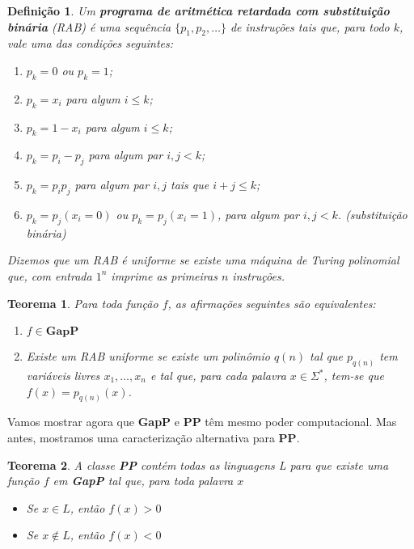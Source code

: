 \documentclass[paper=a4, fontsize=11pt]{scrartcl} %
\newtheorem{theorem}{Teorema}
\newtheorem{definition}{Definição}
\numberwithin{equation}{subsection}
\numberwithin{figure}{subsection}
\numberwithin{table}{subsection}
\numberwithin{definition}{subsection}
\numberwithin{theorem}{subsection}
\numberwithin{property}{subsection}
\numberwithin{proposition}{subsection}
\newcommand{\mwords}{\Sigma^*\xspace}
\newcommand{\PP}{\textbf{PP}\xspace}
\newcommand{\gP}{\textbf{GapP}\xspace}
\begin{document}
\begin{definition} Um \textbf{programa de aritmética retardada com substituição binária} (RAB) é uma sequência $\{p_1, p_2, \dots\}$ de instruções tais que, para todo $k$, vale uma das condições seguintes:
\begin{enumerate}
  \item $p_k = 0$ ou $p_k = 1$;
  \item $p_k = x_i$ para algum $ i \leq k$;
  \item $p_k = 1 - x_i$ para algum $ i \leq k$;
  \item $p_k = p_i - p_j$ para algum par $i, j < k$;
  \item $p_k = p_i p_j$ para algum par $i,j$ tais que $i + j \leq k$;
  \item $p_k = p_j(x_i = 0)$ ou $p_k = p_j(x_i = 1)$, para algum par $i, j < k$. (substituição binária)
\end{enumerate}
Dizemos que um RAB é uniforme se existe uma máquina de Turing polinomial que, com entrada $1^n$ imprime as primeiras $n$ instruções.

\end{definition}

\begin{theorem}
Para toda função $f$, as afirmações seguintes são equivalentes:
\begin{enumerate}

  \item $f \in \gP$
  \item Existe um RAB uniforme se existe um polinômio $q(n)$ tal que $p_{q(n)}$  tem variáveis livres $x_1, \dots, x_n$ e tal que, para cada palavra $x \in \mwords$, tem-se que $f(x) = p_{q(n)}(x)$.
\end{enumerate}

\end{theorem}


Vamos mostrar agora que \gP e \PP têm mesmo poder computacional. Mas antes, mostramos uma caracterização alternativa para \PP.

\begin{theorem}
A classe \PP contém todas as linguagens L para que existe uma função $f$ em \gP tal que, para toda palavra $x$
\begin{itemize}
  \item Se $x \in L$, então $f(x) > 0$ 
  \item Se $x \not\in L$, então $f(x) < 0$ 
\end{itemize}
\end{theorem}
\end{document}
